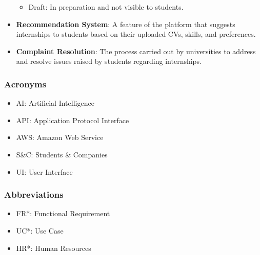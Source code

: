 \begin{itemize}
\begin{itemize}
            \item Draft: In preparation and not visible to students.
        \end{itemize}
    \item \textbf{Recommendation System}: A feature of the platform that suggests internships to students based on their uploaded CVs, skills, and preferences.
    \item \textbf{Complaint Resolution}: The process carried out by universities to address and resolve issues raised by students regarding internships.

\end{itemize}

\subsubsection{Acronyms}
\begin{itemize}
    \item AI: Artificial Intelligence
    \item API: Application Protocol Interface
    \item AWS: Amazon Web Service
    \item S\&C: Students \& Companies
    \item UI: User Interface
\end{itemize}
\subsubsection{Abbreviations}
\begin{itemize}
    \item FR*: Functional Requirement
    \item UC*: Use Case
    \item HR*: Human Resources
\end{itemize}
